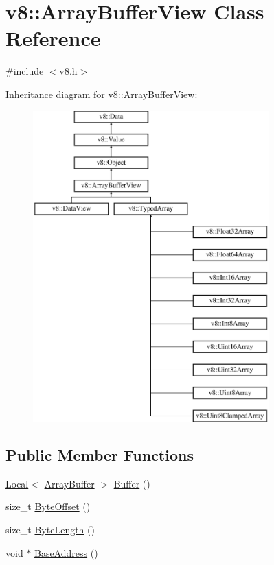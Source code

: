\hypertarget{classv8_1_1_array_buffer_view}{}\section{v8\+:\+:Array\+Buffer\+View Class Reference}
\label{classv8_1_1_array_buffer_view}


{\ttfamily \#include $<$v8.\+h$>$}

Inheritance diagram for v8\+:\+:Array\+Buffer\+View\+:\begin{figure}[H]
\begin{center}
\leavevmode
\includegraphics[height=12.000000cm]{classv8_1_1_array_buffer_view}
\end{center}
\end{figure}
\subsection*{Public Member Functions}
\begin{DoxyCompactItemize}
\item 
\hyperlink{classv8_1_1_local}{Local}$<$ \hyperlink{classv8_1_1_array_buffer}{Array\+Buffer} $>$ \hyperlink{classv8_1_1_array_buffer_view_a2ceba3908fbf98ecc81702083127b046}{Buffer} ()
\item 
size\+\_\+t \hyperlink{classv8_1_1_array_buffer_view_a4739a31269f5ebc5b88a708b9429c688}{Byte\+Offset} ()
\item 
size\+\_\+t \hyperlink{classv8_1_1_array_buffer_view_a9fc7563c97e0b639a6c0a3274995bb3c}{Byte\+Length} ()
\item 
void $\ast$ \hyperlink{classv8_1_1_array_buffer_view_ab4c803d2b1fe5dcd2e593014d576e3f3}{Base\+Address} ()
\end{DoxyCompactItemize}
